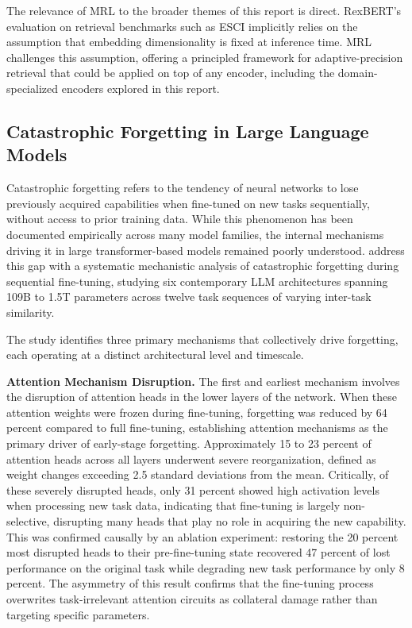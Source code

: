 \documentclass[a4paper,12pt]{article}
\begin{document}
The relevance of MRL to the broader themes of this report is direct. RexBERT's 
evaluation on retrieval benchmarks such as ESCI implicitly relies on the assumption 
that embedding dimensionality is fixed at inference time. MRL challenges this 
assumption, offering a principled framework for adaptive-precision retrieval that 
could be applied on top of any encoder, including the domain-specialized encoders 
explored in this report.

\subsection{Catastrophic Forgetting in Large Language Models}

Catastrophic forgetting refers to the tendency of neural networks to lose previously
acquired capabilities when fine-tuned on new tasks sequentially, without access to
prior training data. While this phenomenon has been documented empirically across
many model families, the internal mechanisms driving it in large transformer-based
models remained poorly understood. \citet{imanov2026mechanistic} address this gap
with a systematic mechanistic analysis of catastrophic forgetting during sequential
fine-tuning, studying six contemporary LLM architectures spanning 109B to 1.5T
parameters across twelve task sequences of varying inter-task similarity.

The study identifies three primary mechanisms that collectively drive forgetting,
each operating at a distinct architectural level and timescale.

\textbf{Attention Mechanism Disruption.} The first and earliest mechanism involves
the disruption of attention heads in the lower layers of the network. When these attention weights were frozen during fine-tuning, forgetting was reduced by 64 percent compared to full fine-tuning, establishing attention mechanisms as the primary driver of
early-stage forgetting. Approximately 15 to 23 percent of attention heads across all
layers underwent severe reorganization, defined as weight changes exceeding 2.5
standard deviations from the mean. Critically, of these severely disrupted heads,
only 31 percent showed high activation levels when processing new task data, indicating
that fine-tuning is largely non-selective, disrupting many heads that play no role
in acquiring the new capability. This was confirmed causally by an ablation
experiment: restoring the 20 percent most disrupted heads to their pre-fine-tuning
state recovered 47 percent of lost performance on the original task while degrading
new task performance by only 8 percent. The asymmetry of this result confirms that
the fine-tuning process overwrites task-irrelevant attention circuits as collateral
damage rather than targeting specific parameters.
\end{document}
